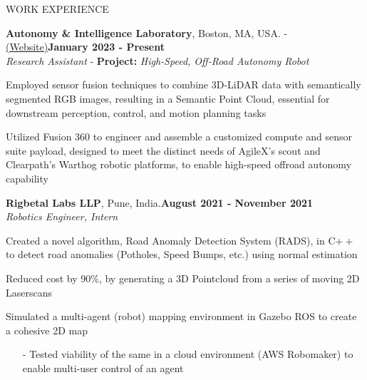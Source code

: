 \documentclass{resume} %
\begin{document}
\begin{rSection}{WORK EXPERIENCE}
\begin{rSubsectiond}{\textbf{Autonomy \& Intelligence Laboratory}, Boston, MA, USA. - \href{https://neu-autonomy.github.io/lab_website/team/}{(Website)}}{\textbf{January 2023 - Present} \\\textit{Research Assistant} - \textbf{Project:} \textit{High-Speed, Off-Road Autonomy Robot}}
        \item Employed sensor fusion techniques to combine 3D-LiDAR data with semantically segmented RGB images, resulting in a Semantic Point Cloud, essential for downstream perception, control, and motion planning tasks
        \item Utilized Fusion 360 to engineer and assemble a customized compute and sensor suite payload, designed to meet the distinct needs of AgileX's scout and Clearpath's Warthog robotic platforms, to enable high-speed offroad autonomy capability
	\end{rSubsectiond}

	\begin{rSubsectiond}{\textbf{Rigbetal Labs LLP}, Pune, India.}{\textbf{August 2021 - November 2021} \\\textit{Robotics Engineer, Intern}}
	\item Created a novel algorithm, Road Anomaly Detection System (RADS), in C$++$ to detect road anomalies (Potholes, Speed Bumps, etc.) using normal estimation
	\item Reduced cost by 90\%, by generating a 3D Pointcloud from a series of moving 2D Laserscans
	\item Simulated a multi-agent (robot) mapping environment in Gazebo ROS to create a cohesive 2D map
	\begin{itemize}
 \vspace{-2mm}
	    \item[-] Tested viability of the same in a cloud environment (AWS Robomaker) to enable multi-user control of an agent
	\end{itemize}
	\end{rSubsectiond}


\end{rSection}
\end{document}
